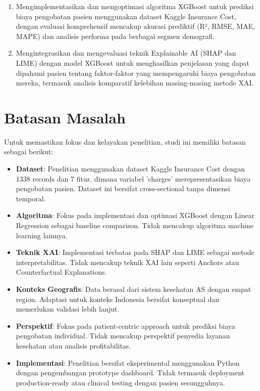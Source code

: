 \begin{enumerate}
\item Mengimplementasikan dan mengoptimasi algoritma XGBoost untuk prediksi biaya pengobatan pasien menggunakan dataset Kaggle Insurance Cost, dengan evaluasi komprehensif mencakup akurasi prediktif (R², RMSE, MAE, MAPE) dan analisis performa pada berbagai segmen demografi.

\item Mengintegrasikan dan mengevaluasi teknik Explainable AI (SHAP dan LIME) dengan model XGBoost untuk menghasilkan penjelasan yang dapat dipahami pasien tentang faktor-faktor yang mempengaruhi biaya pengobatan mereka, termasuk analisis komparatif kelebihan masing-masing metode XAI.
\end{enumerate}

\section{Batasan Masalah}
Untuk memastikan fokus dan kelayakan penelitian, studi ini memiliki batasan sebagai berikut:

\begin{itemize}
    \item \textbf{Dataset}: Penelitian menggunakan dataset Kaggle Insurance Cost dengan 1338 records dan 7 fitur, dimana variabel 'charges' merepresentasikan biaya pengobatan pasien. Dataset ini bersifat cross-sectional tanpa dimensi temporal.
    
    \item \textbf{Algoritma}: Fokus pada implementasi dan optimasi XGBoost dengan Linear Regression sebagai baseline comparison. Tidak mencakup algoritma machine learning lainnya.
    
    \item \textbf{Teknik XAI}: Implementasi terbatas pada SHAP dan LIME sebagai metode interpretabilitas. Tidak mencakup teknik XAI lain seperti Anchors atau Counterfactual Explanations.
    
    \item \textbf{Konteks Geografis}: Data berasal dari sistem kesehatan AS dengan empat region. Adaptasi untuk konteks Indonesia bersifat konseptual dan memerlukan validasi lebih lanjut.
    
    \item \textbf{Perspektif}: Fokus pada patient-centric approach untuk prediksi biaya pengobatan individual. Tidak mencakup perspektif penyedia layanan kesehatan atau analisis profitabilitas.
    
    \item \textbf{Implementasi}: Penelitian bersifat eksperimental menggunakan Python dengan pengembangan prototype dashboard. Tidak termasuk deployment production-ready atau clinical testing dengan pasien sesungguhnya.
\end{itemize}

